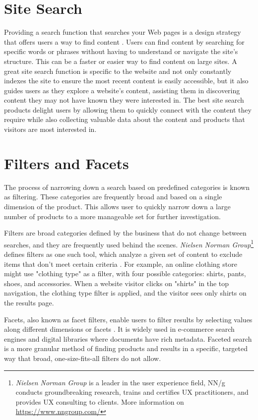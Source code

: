 \section{Site Search}
Providing a search function that searches your Web pages is a design strategy that offers users a way to find content \autocite{w3c2016search}. Users can find content by searching for specific words or phrases without having to understand or navigate the site's structure. This can be a faster or easier way to find content on large sites. A great site search function is specific to the website and not only constantly indexes the site to ensure the most recent content is easily accessible, but it also guides users as they explore a website's content, assisting them in discovering content they may not have known they were interested in. The best site search products delight users by allowing them to quickly connect with the content they require while also collecting valuable data about the content and products that visitors are most interested in.


\section{Filters and Facets}
\label{filters_and_facets}
The process of narrowing down a search based on predefined categories is known as filtering. These categories are frequently broad and based on a single dimension of the product. This allows user to quickly narrow down a large number of products to a more manageable set for further investigation.

Filters are broad categories defined by the business that do not change between searches, and they are frequently used behind the scenes. \emph{Nielsen Norman Group}\footnote{\emph{Nielsen Norman Group} is a leader in the user experience field, NN/g conducts groundbreaking research, trains and certifies UX practitioners, and provides UX consulting to clients. More information on \url{https://www.nngroup.com/}} defines filters as one such tool, which analyze a given set of content to exclude items that don't meet certain criteria \autocite{whitenton2014filters}. For example, an online clothing store might use "clothing type" as a filter, with four possible categories: shirts, pants, shoes, and accessories. When a website visitor clicks on "shirts" in the top navigation, the clothing type filter is applied, and the visitor sees only shirts on the results page.

Facets, also known as facet filters, enable users to filter results by selecting values along different dimensions or facets \autocite{qu2021study}. It is widely used in e-commerce search engines and digital libraries where documents have rich metadata. Faceted search is a more granular method of finding products and results in a specific, targeted way that broad, one-size-fits-all filters do not allow.

